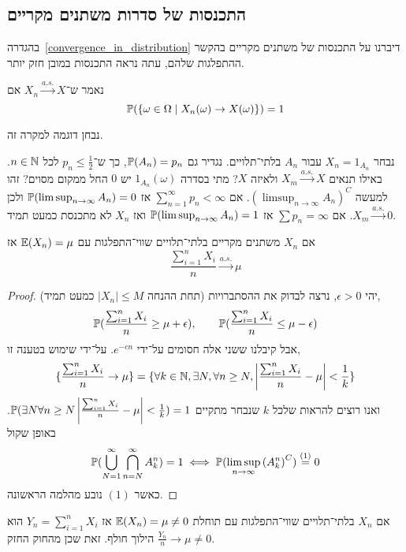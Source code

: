 \subsection{התכנסות של סדרות משתנים מקריים}\label{almost_surely_convergence}
בהגדרה\ \ref{convergence_in_distribution} דיברנו על התכנסות של משתנים מקריים בהקשר ההתפלגות שלהם, עתה נראה התכנסות במובן חזק יותר.
\begin{definition}
	נאמר ש־$X_n \xrightarrow{a.s.} X$ אם
	\[
		\mathbb{P}(\{ \omega \in \Omega \mid X_n(\omega) \to X(\omega) \}) = 1
	\]
\end{definition}
נבחן דוגמה למקרה זה.
\begin{example}
	נבחר $X_n = 1_{A_n}$ עבור $A_n$ בלתי־תלויים.
	נגדיר גם $\mathbb{P}(A_n) = p_n$, כך ש־$p_n \le \frac{1}{2}$ לכל $n \in \mathbb{N}$.
	באילו תנאים $X_m \xrightarrow{a.s.} X$ ולאיזה $X$?
	מתי בסדרה $1_{A_n}(\omega)$ יש $0$ החל ממקום מסוים?
	זהו למעשה ${(\limsup_{n \to \infty} A_n)}^C$.
	אם $\sum_{n = 1}^{\infty} p_n < \infty$ אז $\mathbb{P}(\limsup_{n \to \infty} A_n) = 0$ ולכן $X_m \xrightarrow{a.s.} 0$.
	אם $\sum p_n = \infty$ אז $\mathbb{P}(\limsup_{n \to \infty} A_n) = 1$ ואז $X_n$ לא מתכנסת כמעט תמיד.
\end{example}
\begin{theorem}
	אם $X_n$ משתנים מקריים בלתי־תלויים שווי־התפלגות עם $\mathbb{E}(X_n) = \mu$ אז
	\[
		\frac{\sum_{i = 1}^{n} X_i}{n} \xrightarrow{a.s.} \mu
	\]
\end{theorem}
\begin{proof} (תחת ההנחה $|X_n| \le M$ כמעט תמיד)
	יהי $\epsilon > 0$,
	נרצה לבדוק את ההסתברויות,
	\[
		\mathbb{P}(\frac{\sum_{i = 1}^{n} X_i}{n} \ge \mu + \epsilon),
		\qquad
		\mathbb{P}(\frac{\sum_{i = 1}^{n} X_i}{n} \le \mu - \epsilon)
	\]
	אבל קיבלנו ששני אלה חסומים על־ידי $e^{-cn}$.
	על־ידי שימוש בטענה זו,
	\[
		\{ \frac{\sum_{i = 1}^{n} X_i}{n} \to \mu \}
		= \{ \forall k \in \mathbb{N}, \exists N, \forall n \ge N, \left\lvert \frac{\sum_{i = 1}^{n} X_i}{n} - \mu \right\rvert < \frac{1}{k} \}
	\]
	ואנו רוצים להראות שלכל $k$ שנבחר מתקיים $\mathbb{P}(\exists N \forall n \ge N \left\lvert \frac{\sum_{i = 1}^{n} X_i}{n} - \mu \right\rvert < \frac{1}{k}) = 1$.
	באופן שקול
	\[
		\mathbb{P}(\bigcup_{N = 1}^\infty \bigcap_{n = N}^\infty A_k^n) = 1
		\iff
		\mathbb{P}(\limsup_{n \to \infty} {(A_k^n)}^C) \overset{(1)}{=} 0
	\]
	כאשר $(1)$ נובע מהלמה הראשונה.
\end{proof}
\begin{conclusion}
	אם $X_n$ בלתי־תלויים שווי־התפלגות עם תוחלת $\mathbb{E}(X_n) = \mu \ne 0$ אז $Y_n = \sum_{i = 1}^{n} X_i$ הוא הילוך חולף.
	זאת שכן מהחוק החזק $\frac{Y_n}{n} \to \mu \ne 0$.
\end{conclusion}

